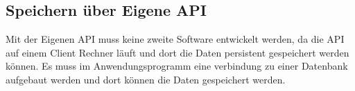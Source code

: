 \subsection{Speichern über Eigene API}
\label{save_data_own_api_kon}

Mit der Eigenen API muss keine zweite Software entwickelt werden, da die API auf einem Client Rechner läuft und dort die Daten persistent gespeichert werden können. Es muss im Anwendungsprogramm eine verbindung zu einer Datenbank aufgebaut werden und dort können die Daten gespeichert werden.